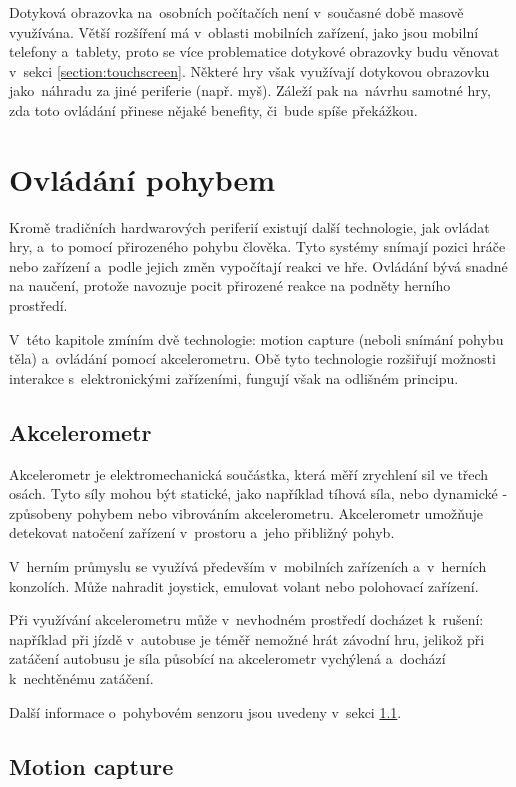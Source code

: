 \documentclass[thesis=B,czech,hidelinks]{FITthesis}[2012/06/26] %
\begin{document}
Dotyková obrazovka na~osobních počítačích není v~současné době masově využívána. Větší rozšíření má v~oblasti mobilních zařízení, jako jsou mobilní telefony a~tablety, proto se více problematice dotykové obrazovky budu věnovat v~sekci \ref{section:touchscreen}. Některé hry však využívají dotykovou obrazovku jako~náhradu za jiné periferie (např. myš). Záleží pak na~návrhu samotné hry, zda toto ovládání přinese nějaké benefity, či~bude spíše překážkou.

\section{Ovládání pohybem}

Kromě tradičních hardwarových periferií existují další technologie, jak ovládat hry, a~to pomocí přirozeného pohybu člověka. Tyto systémy snímají pozici hráče nebo zařízení a~podle jejich změn vypočítají reakci ve hře. Ovládání bývá snadné na naučení, protože navozuje pocit přirozené reakce na podněty herního prostředí.

V~této kapitole zmíním dvě technologie: motion capture (neboli snímání pohybu těla) a~ovládání pomocí akcelerometru. Obě tyto technologie rozšiřují možnosti interakce s~elektronickými zařízeními, fungují však na odlišném principu.

\subsection{Akcelerometr}
\label{section:accelerometer}

Akcelerometr je elektromechanická součástka, která měří zrychlení sil ve třech osách. Tyto síly mohou být statické, jako například tíhová síla, nebo dynamické - způsobeny pohybem nebo vibrováním akcelerometru.\cite{acc} Akcelerometr umožňuje detekovat natočení zařízení v~prostoru a~jeho přibližný pohyb.

V~herním průmyslu se využívá především v~mobilních zařízeních a~v~herních konzolích. Může nahradit joystick, emulovat volant nebo polohovací zařízení. 

Při využívání akcelerometru může v~nevhodném prostředí docházet k~rušení: například při jízdě v~autobuse je téměř nemožné hrát závodní hru, jelikož při zatáčení autobusu je síla působící na akcelerometr vychýlená a~dochází k~nechtěnému zatáčení.

Další informace o~pohybovém senzoru jsou uvedeny v~sekci \ref{section:accelerometer}.

\subsection{Motion capture}
\label{section:motion_capture}
\end{document}
